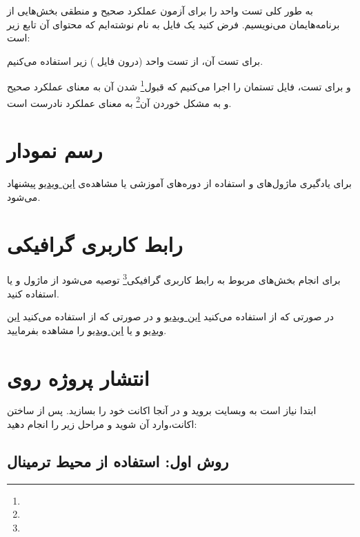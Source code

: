 به طور کلی تست واحد را برای آزمون عملکرد صحیح و منطقی بخش‌هایی از برنامه‌هایمان می‌نویسیم. فرض کنید یک فایل به نام  نوشته‌ایم که محتوای آن تابع زیر است:



برای تست آن، از تست واحد (درون فایل ) زیر استفاده می‌کنیم.


و برای تست، فایل تستمان را اجرا می‌کنیم
که قبول\footnote{} شدن آن به معنای عملکرد صحیح و به مشکل خوردن آن\footnote{} به معنای عملکرد نادرست است.


\section{رسم نمودار}

برای یادگیری ماژول‌های  و  استفاده از دوره‌های آموزشی \href{https://www.kaggle.com}{\underline{}} یا مشاهده‌‌ی \href{https://www.youtube.com/watch?v=LnGz20B3nTU}{\underline{این ویدیو}} پیشنهاد می‌شود.

\section{رابط کاربری گرافیکی}

برای انجام بخش‌های مربوط به رابط کاربری گرافیکی\footnote{} توصیه می‌شود از ماژول  و یا  استفاده کنید.

در صورتی که از  استفاده می‌کنید \href{https://www.youtube.com/watch?v=ibf5cx221hk}{\underline{این ویدیو}} و در صورتی که از  استفاده می‌کنید \href{https://www.youtube.com/watch?v=MOItX2aKTGc}{\underline{این ویدیو}} و یا \href{https://www.youtube.com/watch?v=hX8fj8SGZJs}{\underline{این ویدیو}} را مشاهده بفرمایید.

\section{انتشار پروژه روی }

ابتدا نیاز است به وبسایت \href{https://www.github.com}{} بروید و در آنجا اکانت خود را بسازید. پس از ساختن اکانت،وارد آن شوید و مراحل زیر را انجام دهید:

\subsection{روش اول: استفاده از محیط ترمینال}

